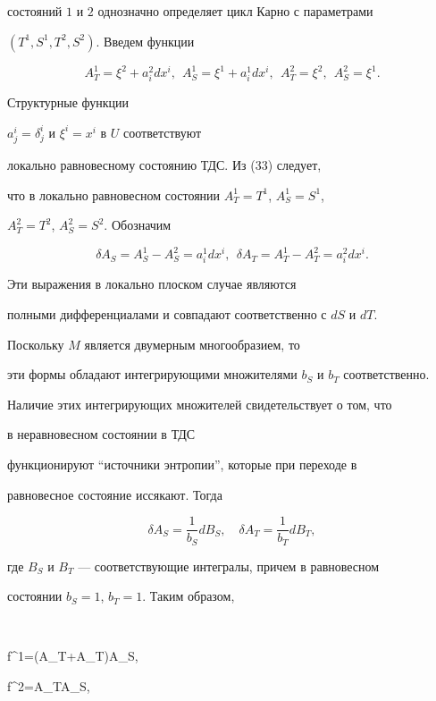 состояний $1$ и $2$ однозначно определяет цикл Карно с параметрами


$(T^1,S^1,T^2,S^2)$. Введем функции


\begin{equation}


A^1_T=\xi^2+a^2_idx^i,\ \ A_S^1=\xi^1+a^1_idx^i,


\ \ A_T^2=\xi^2,\ \ A_S^2=\xi^1.


\end{equation}


Структурные функции


$a^i_j=\delta^i_j$ и $\xi^i=x^i$ в $U$ соответствуют


локально равновесному состоянию ТДС. Из (33) следует,


что в локально равновесном состоянии $A^1_T=T^1$, $A^1_S=S^1$,


$A^2_T=T^2$, $A^2_S=S^2$. Обозначим


$$


\delta A_S=A_S^1 - A_S^2=a^1_idx^i,\ \ 


\delta A_T=A_T^1 - A_T^2=a^2_idx^i.


$$


Эти выражения в локально плоском случае являются


полными дифференциалами и совпадают соответственно с $dS$ и $dT$.


Поскольку $M$ является двумерным многообразием, то


эти формы обладают интегрирующими множителями $b_S$ и $b_T$ соответственно.


Наличие этих интегрирующих множителей свидетельствует о том, что


в неравновесном состоянии в ТДС


функционируют ``источники энтропии'', которые при переходе в


равновесное состояние иссякают. Тогда


$$


\delta A_S=\frac{1}{b_S}dB_S,\quad 


\delta A_T=\frac{1}{b_T}dB_T,


$$


где $B_S$ и $B_T$ --- соответствующие интегралы, причем в равновесном


состоянии $b_S=1$, $b_T=1$. Таким образом,


$$


f^1=(\delta A_T+A_T)\delta A_S,\quad


f^2=A_T\delta A_S,



